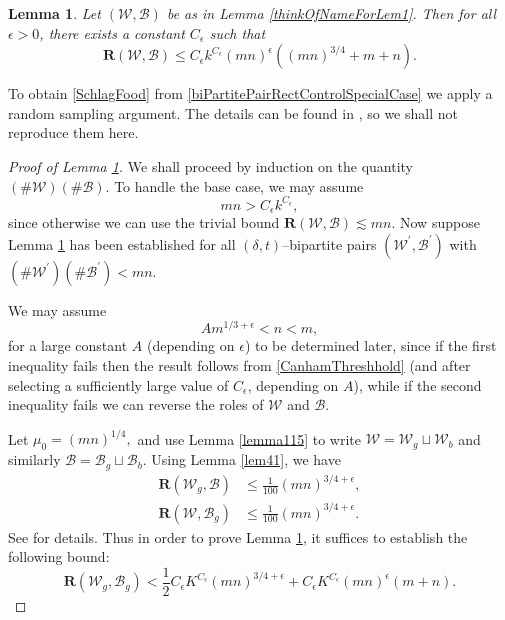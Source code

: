 \documentclass[reqno]{amsart}
\newtheorem{lem}[thm]{Lemma}
\theoremstyle{definition}
\theoremstyle{remark}
\theoremstyle{remark}
\newcommand{\dt}{(\delta,t)}
\newcommand{\WC}{\mathcal W}
\newcommand{\BC}{\mathcal B}
\newcommand{\WB}{(\mathcal W,\mathcal B)}
\newcommand{\rect}{\mathbf{R}}
\begin{document}
\begin{lem}\label{muNuEqualsOneCase}
Let $\WB$ be as in Lemma \ref{thinkOfNameForLem1}. Then for all $\epsilon>0$, there exists a constant $C_\epsilon$ such that
\begin{equation}\label{biPartitePairRectControlSpecialCase}
\rect(\WC,\BC)\leq C_\epsilon k^{C_\epsilon}(mn)^\epsilon ((mn)^{3/4}+m+n).
\end{equation}

\end{lem}

To obtain \eqref{SchlagFood} from \eqref{biPartitePairRectControlSpecialCase} we apply a random sampling argument. The details can be found in \cite[p1253]{Wolff4}, so we shall not reproduce them here.
\begin{proof}[Proof of Lemma \ref{muNuEqualsOneCase}]
We shall proceed by induction on the quantity $(\#\WC)(\#\BC)$.
%
%
To handle the base case, we may assume
\begin{equation}\label{mIsBig}
mn> C_\epsilon k^{C_\epsilon},
\end{equation}
since otherwise we can use the trivial bound $\rect(\WC,\BC) \lesssim mn$. Now suppose Lemma \ref{muNuEqualsOneCase} has been established for all $\dt$--bipartite pairs $(\WC^\prime,\BC^\prime)$ with $(\#\WC^\prime)(\#\BC^\prime)<mn$.

We may assume
\begin{equation}\label{mAndNNotTooDifferent}
 Am^{1/3+\epsilon}<n<m,
\end{equation}
for a large constant $A$ (depending on $\epsilon$) to be determined later, since if the first inequality fails then the result follows from \eqref{CanhamThreshhold} (and after selecting a sufficiently large value of $C_\epsilon$, depending on $A$), while if the second inequality fails we can reverse the roles of $\WC$ and $\BC$.

Let $\mu_0 = (mn)^{1/4},$ and use Lemma \ref{lemma115} to write $\WC=\WC_g\sqcup\WC_b$ and similarly $\BC=\BC_g\sqcup\BC_b$. Using Lemma \ref{lem41}, we have
\begin{align}
\rect(\WC_g,\BC)&\leq\frac{1}{100}(mn)^{3/4+\epsilon},\\
\rect(\WC,\BC_g)&\leq\frac{1}{100}(mn)^{3/4+\epsilon}.
\end{align}
See \cite[p1251-2]{Wolff4} for details. Thus in order to prove Lemma \ref{muNuEqualsOneCase}, it suffices to establish the following bound:
\begin{equation}\label{controlOfWgBg}
\rect(\WC_g,\BC_g)<\frac{1}{2}C_\epsilon K^{C_\epsilon}(mn)^{3/4+\epsilon}+C_\epsilon K^{C_\epsilon}(mn)^{\epsilon}(m+n).
\end{equation}


\end{proof}
\end{document}
